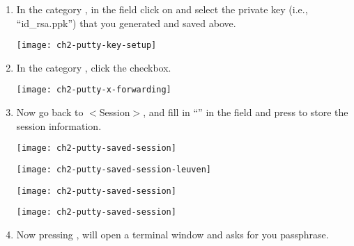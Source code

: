 \begin{enumerate}
    \item  In the category , in the
      field  click on
       and select the private key (i.e., ``id\_rsa.ppk'')
      that you generated and saved above.

      \begin{center}
      \texttt{[image: ch2-putty-key-setup]}
      \end{center}

    \item  In the category , click
      the  checkbox.

      \begin{center}
      \texttt{[image: ch2-putty-x-forwarding]}
      \end{center}

    \item  Now go back to $<$Session$>$, and fill in ``\emph{\hpcname}'' in the
       field and press  to
      store the session information.

\ifantwerpen
      \begin{center}
      \texttt{[image: ch2-putty-saved-session]}
      \end{center}
\fi
\ifleuven
      \begin{center}
      \texttt{[image: ch2-putty-saved-session-leuven]}
      \end{center}
\fi
\ifbrussel
      \begin{center}
      \texttt{[image: ch2-putty-saved-session]}
      \end{center}
\fi
\ifgent
      \begin{center}
      \texttt{[image: ch2-putty-saved-session]}
      \end{center}
\fi


    \item  Now pressing , will open a terminal window and
      asks for you passphrase.


\end{enumerate}
